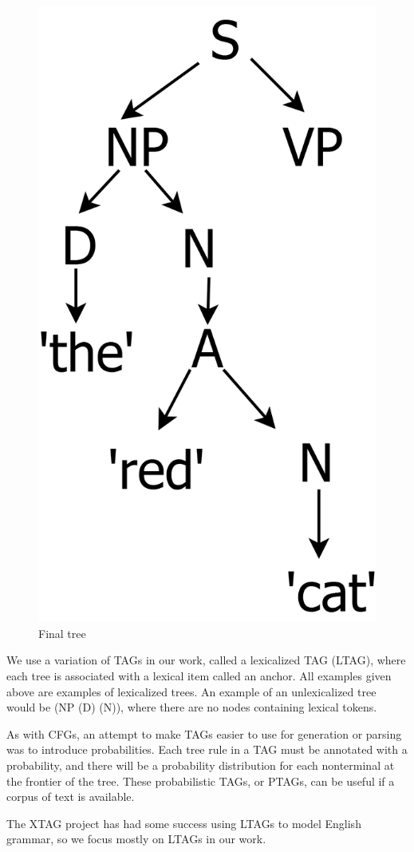 \begin{figure}[ht]
\begin{minipage}[b]{0.3\linewidth}
\includegraphics[width=\linewidth]{tree-3.png}
\caption{Final tree}
\label{tree-3}
\end{minipage}
\end{figure}

We use a variation of TAGs in our work, called a lexicalized TAG (LTAG), where each tree is
associated with a lexical item called an anchor.  All examples given above are examples of
lexicalized trees.  An example of an unlexicalized tree would be (NP (D) (N)), where there
are no nodes containing lexical tokens.

As with CFGs, an attempt to make TAGs easier to use for generation or parsing was to
introduce probabilities.  Each tree rule in a TAG must be annotated with a probability, and
there will be a probability distribution for each nonterminal at the frontier of the tree.
These probabilistic TAGs, or PTAGs, can be useful if a corpus of text is available.

The XTAG project has had some success using LTAGs to model English grammar\cite{xtag}, 
so we focus mostly on LTAGs in our work.